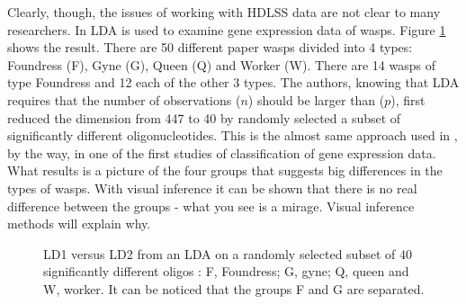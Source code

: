\documentclass[12]{article}
\newcommand{\blue}{\color{blue}}
\begin{document}

Clearly, though, the issues of working with HDLSS data are not clear to many researchers. In \cite{toth:2010} LDA is used to examine gene expression data of wasps. Figure \ref{oligo} shows the result. There are 50 different paper wasps divided into 4 types: Foundress (F), Gyne (G), Queen (Q) and Worker (W). There are 14  wasps of type Foundress and 12 each of the other 3 types. The authors, knowing that LDA requires that the number of observations ($n$) should be larger than ($p$), first reduced the dimension from 447 to 40 by randomly selected a subset of significantly different oligonucleotides. This is the almost same approach used in \cite{dudoit:2002}, by the way, in one of the first studies of classification of gene expression data. What results is a picture of the four groups that suggests big differences in the types of wasps. With visual inference it can be shown that there is no real difference between the groups - what you see is a mirage. Visual inference methods will explain why. 

\begin{figure}[hbtp]
   \centering
       \caption{LD1 versus LD2 from an LDA on a randomly selected subset of 40 significantly different oligos : F, Foundress; G, gyne; Q, queen and W, worker. It can be noticed that the groups F and G are separated. }
     \label{oligo}
\end{figure}  
\end{document}
